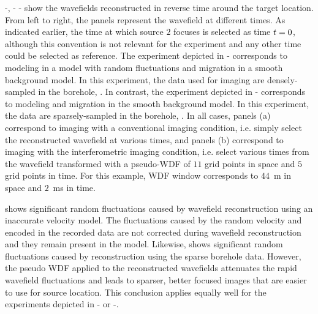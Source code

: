 -, -
 - show the wavefields
reconstructed in reverse time around the target location. From left to
right, the panels represent the wavefield at different times. As
indicated earlier, the time at which source $2$ focuses is selected as
time ${t}=0$, although this convention is not relevant for the
experiment and any other time could be selected as reference. The
experiment depicted in - corresponds to
modeling in a model with random fluctuations and migration in a smooth
background model. In this experiment, the data used for imaging are
densely-sampled in the borehole, . In contrast, the experiment
depicted in - corresponds to modeling
and migration in the smooth background model. In this experiment, the
data are sparsely-sampled in the borehole, .  In all cases, panels (a) correspond to imaging with
a conventional imaging condition, i.e. simply select the reconstructed
wavefield at various times, and panels (b) correspond to imaging with
the interferometric imaging condition, i.e. select various times from
the wavefield transformed with a pseudo-WDF of $11$ grid points in
space and $5$ grid points in time. For this example, WDF window
corresponds to $44$~m in space and $2$~ms in time.

 shows significant random fluctuations caused by
wavefield reconstruction using an inaccurate velocity model. The
fluctuations caused by the random velocity and encoded in the recorded
data are not corrected during wavefield reconstruction and they remain
present in the model. Likewise,  shows significant
random fluctuations caused by reconstruction using the sparse borehole
data. However, the  pseudo WDF applied to the
reconstructed wavefields attenuates the rapid wavefield fluctuations
and leads to sparser, better focused images that are easier to use for
source location. This conclusion applies equally well for the
experiments depicted in - or
-.


